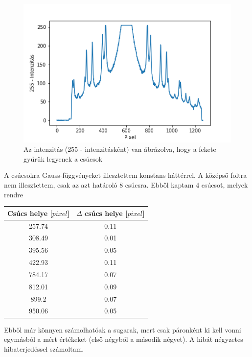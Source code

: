 \documentclass[a4paper,12pt]{article}
\begin{document}
\begin{figure}[!htb]
\centering
\includegraphics[width=0.65\linewidth]{./kalib.png}
\caption{ Az intenzitás (255 - intenzitásként) van ábrázolva, hogy a fekete gyűrűk legyenek a csúcsok}
\end{figure}

\vspace{5mm}

\par A csúcsokra Gauss-függvényeket illesztettem konstans háttérrel. A középső foltra nem illesztettem, csak az azt határoló 8 csúcsra. Ebből kaptam 4 csúcsot, melyek rendre

\vspace{5mm}

\begin{center}
\begin{tabular}{|c|c|}
\hline
Csúcs helye [$pixel$] & $\Delta$ csúcs helye [$pixel$] \\
\hline
257.74 & 0.11 \\
\hline
308.49 & 0.01 \\
\hline
395.56 & 0.05 \\
\hline
422.93 & 0.11 \\
\hline
784.17 & 0.07 \\
\hline
812.01 & 0.09 \\
\hline
899.2 & 0.07 \\
\hline
950.06 & 0.05 \\
\hline
\end{tabular}
\end{center}

\vspace{5mm}

\par Ebből már könnyen számolhatóak a sugarak, mert csak páronként ki kell vonni egymásból a mért értékeket (első négyből a második négyet). A hibát négyzetes hibaterjedéssel számoltam.

\vspace{5mm}
\end{document}
